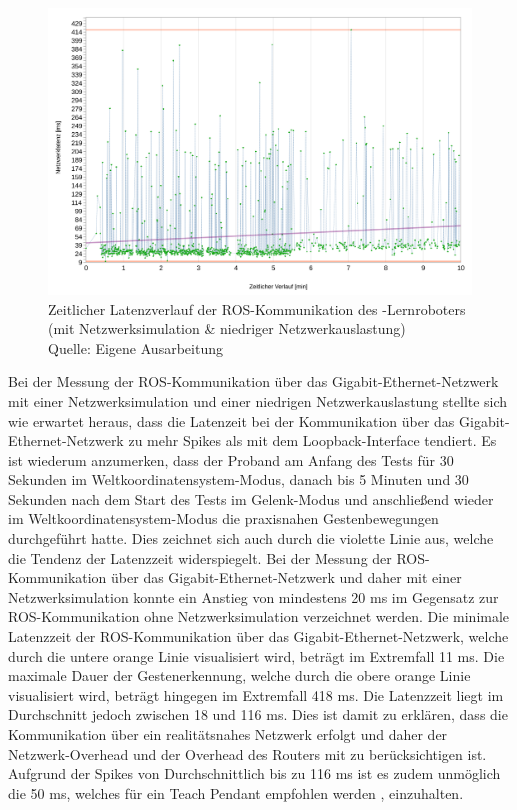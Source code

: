 \begin{figure}[htb]
	\centering
	\includegraphics[width=1.04\textwidth]{images/ergebnisse/ROS_App_und_mit_Netzwerksimulation}
	\caption[Zeitlicher Latenzverlauf der ROS-Kommunikation des -Lernroboters (mit Netzwerksimulation \& niedriger Netzwerkauslastung)]{Zeitlicher Latenzverlauf der ROS-Kommunikation des -Lernroboters (mit Netzwerksimulation \& niedriger Netzwerkauslastung)\\Quelle: Eigene Ausarbeitung}
	\label{fig:measurement_robot_ros_with_network_simulation_low_network_traffic}
\end{figure}
\FloatBarrier

Bei der Messung der ROS-Kommunikation über das Gigabit-Ethernet-Netzwerk mit einer Netzwerksimulation und einer niedrigen Netzwerkauslastung stellte sich wie erwartet heraus, dass die Latenzeit bei der Kommunikation über das Gigabit-Ethernet-Netzwerk zu mehr Spikes als mit dem Loopback-Interface tendiert. Es ist wiederum anzumerken, dass der Proband am Anfang des Tests für 30 Sekunden im Weltkoordinatensystem-Modus, danach bis 5 Minuten und 30 Sekunden nach dem Start des Tests im Gelenk-Modus und anschließend wieder im Weltkoordinatensystem-Modus die praxisnahen Gestenbewegungen durchgeführt hatte. Dies zeichnet sich auch durch die violette Linie aus, welche die Tendenz der Latenzzeit widerspiegelt. Bei der Messung der ROS-Kommunikation über das Gigabit-Ethernet-Netzwerk und daher mit einer Netzwerksimulation konnte ein Anstieg von mindestens 20 ms im Gegensatz zur ROS-Kommunikation ohne Netzwerksimulation verzeichnet werden. Die minimale Latenzzeit der ROS-Kommunikation über das Gigabit-Ethernet-Netzwerk, welche durch die untere orange Linie visualisiert wird, beträgt im Extremfall \num{11} ms. Die maximale Dauer der Gestenerkennung, welche durch die obere orange Linie visualisiert wird, beträgt hingegen im Extremfall \num{418} ms. Die Latenzzeit liegt im Durchschnitt jedoch zwischen 18 und 116 ms. Dies ist damit zu erklären, dass die Kommunikation über ein realitätsnahes Netzwerk erfolgt und daher der Netzwerk-Overhead und der Overhead des Routers mit zu berücksichtigen ist. Aufgrund der Spikes von Durchschnittlich bis zu 116 ms ist es zudem unmöglich die 50 ms, welches für ein Teach Pendant empfohlen werden \cite[55]{prassler_advances_2004}, einzuhalten.

